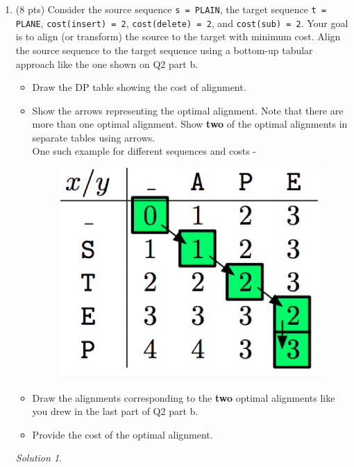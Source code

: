 \documentclass[12pt]{article}
\theoremstyle{remark}
\newtheorem*{solution}{Solution}
\begin{document}
\begin{enumerate}
\begin{enumerate}
    \pagebreak
    \item (8 pts) Consider the source sequence \texttt{s = PLAIN}, the target sequence \texttt{t = PLANE}, \texttt{cost(insert) = 2}, \texttt{cost(delete) = 2}, and \texttt{cost(sub) = 2}. Your goal is to align (or transform) the source to the target with minimum cost. Align the source sequence to the target sequence using a bottom-up tabular approach like the one shown on Q2 part b.
    \begin{itemize}
        \item Draw the DP table showing the cost of alignment.
        \item Show the arrows representing the optimal alignment. Note that there are more than one optimal alignment. Show \textbf{two} of the optimal alignments in separate tables using arrows. 
        \\One such example for different sequences and costs - 
        
            \begin{figure}[h!]
            \begin{center}
            \includegraphics[scale=0.3]{Example.jpeg}
            \end{center}
            \end{figure}
        
        \item Draw the alignments corresponding to the \textbf{two} optimal alignments like you drew in the last part of Q2 part b. 
        \item Provide the cost of the optimal alignment. \\
    \end{itemize}
    
    \begin{solution}
\pagebreak
    \end{solution}
    
    
    
    
\end{enumerate}

\end{enumerate}
\pagebreak
\end{document}
